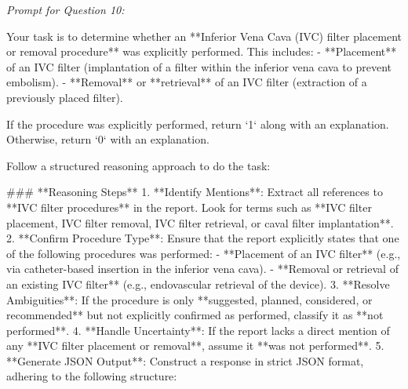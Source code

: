 \textit{\normalsize Prompt for Question  10:}
\begin{mdframed}[]
\normalsize

Your task is to determine whether an **Inferior Vena Cava (IVC) filter placement or removal procedure** was explicitly performed. This includes:  
- **Placement** of an IVC filter (implantation of a filter within the inferior vena cava to prevent embolism).  
- **Removal** or **retrieval** of an IVC filter (extraction of a previously placed filter).  

If the procedure was explicitly performed, return `1` along with an explanation. Otherwise, return `0` with an explanation.

Follow a structured reasoning approach to do the task:

### **Reasoning Steps**  
1. **Identify Mentions**: Extract all references to **IVC filter procedures** in the report. Look for terms such as **IVC filter placement, IVC filter removal, IVC filter retrieval, or caval filter implantation**.  
2. **Confirm Procedure Type**: Ensure that the report explicitly states that one of the following procedures was performed:  
   - **Placement of an IVC filter** (e.g., via catheter-based insertion in the inferior vena cava).  
   - **Removal or retrieval of an existing IVC filter** (e.g., endovascular retrieval of the device).  
3. **Resolve Ambiguities**: If the procedure is only **suggested, planned, considered, or recommended** but not explicitly confirmed as performed, classify it as **not performed**.  
4. **Handle Uncertainty**: If the report lacks a direct mention of any **IVC filter placement or removal**, assume it **was not performed**.  
5. **Generate JSON Output**: Construct a response in strict JSON format, adhering to the following structure:  

\end{mdframed}

